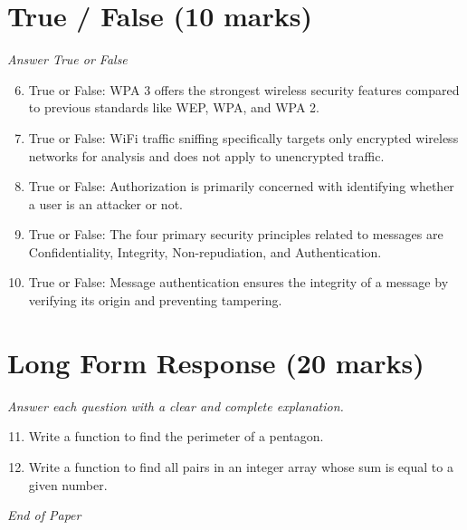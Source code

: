\documentclass[12pt]{article}
\begin{document}
\section*{True / False (10 marks)}
\textit{Answer True or False}
\begin{enumerate}[label=\arabic*.]
\setcounter{enumi}{5}
\item True or False: WPA 3 offers the strongest wireless security features compared to previous standards like WEP, WPA, and WPA 2.
\item True or False: WiFi traffic sniffing specifically targets only encrypted wireless networks for analysis and does not apply to unencrypted traffic.
\item True or False: Authorization is primarily concerned with identifying whether a user is an attacker or not.
\item True or False: The four primary security principles related to messages are Confidentiality, Integrity, Non-repudiation, and Authentication.
\item True or False: Message authentication ensures the integrity of a message by verifying its origin and preventing tampering.
\end{enumerate}

\section*{Long Form Response (20 marks)}
\textit{Answer each question with a clear and complete explanation.}
\begin{enumerate}[label=\arabic*.]
\setcounter{enumi}{10}
\item Write a function to find the perimeter of a pentagon.
\item Write a function to find all pairs in an integer array whose sum is equal to a given number.
\end{enumerate}

\vfill
\noindent\textit{End of Paper}
\end{document}
